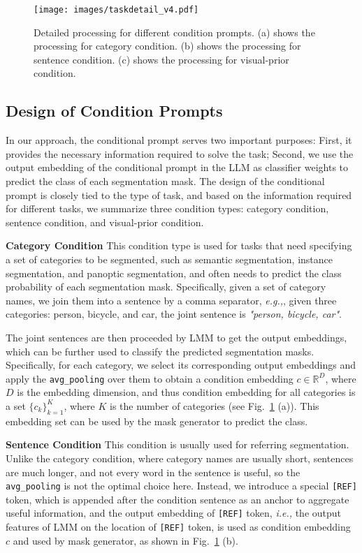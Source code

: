 \begin{figure}[!t]
  \centering
  \texttt{[image: images/taskdetail\_v4.pdf]}
  \caption{Detailed processing for different condition prompts. (a) shows the processing for category condition. (b) shows the processing for sentence condition. (c) shows the processing for visual-prior condition.}
  \label{fig:taskdetail}
\end{figure}
\subsection{Design of Condition Prompts}
\label{sec:condition_prompt}
In our approach, the conditional prompt serves two important purposes: First, it provides the necessary information required to solve the task; Second, we use the output embedding of the conditional prompt in the LLM as classifier weights to predict the class of each segmentation mask. The design of the conditional prompt is closely tied to the type of task, and based on the information required for different tasks, we summarize three condition types: category condition, sentence condition, and visual-prior condition.

\noindent\textbf{Category Condition} This condition type is used for tasks that need specifying a set of categories to be segmented, such as semantic segmentation, instance segmentation, and panoptic segmentation, and often needs to predict the class probability of each segmentation mask. Specifically, given a set of category names, we join them into a sentence by a comma separator, \textit{e.g.,}, given three categories: person, bicycle, and car, the joint sentence is \textit{"person, bicycle, car"}. 

The joint sentences are then proceeded by LMM to get the output embeddings, which can be further used to classify the predicted segmentation masks. Specifically, for each category, we select its corresponding output embeddings and apply the \texttt{avg\_pooling} over them to obtain a condition embedding $c \in \mathbb{R}^{D}$, where $D$ is the embedding dimension, and thus condition embedding for all categories is a set $\{c_{k}\}_{k=1}^{K}$, where $K$ is the number of categories (see Fig.~\ref{fig:taskdetail} (a)). This embedding set can be used by the mask generator to predict the class.

\noindent\textbf{Sentence Condition} This condition is usually used for referring segmentation. Unlike the category condition, where category names are usually short, sentences are much longer, and not every word in the sentence is useful, so the \texttt{avg\_pooling} is not the optimal choice here. Instead, we introduce a special \texttt{[REF]} token, which is appended after the condition sentence as an anchor to aggregate useful information, and the output embedding of \texttt{[REF]} token, \textit{i.e.,} the output features of LMM on the location of \texttt{[REF]} token, is used as condition embedding $c$ and used by mask generator, as shown in Fig.~\ref{fig:taskdetail} (b).

